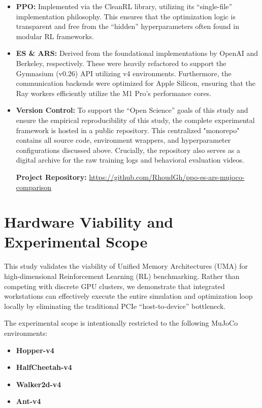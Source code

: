 \begin{itemize}
    \item \textbf{PPO:} Implemented via the CleanRL library, utilizing its ``single-file'' implementation philosophy. This ensures that the optimization logic is transparent and free from the ``hidden'' hyperparameters often found in modular RL frameworks.
    
    \item \textbf{ES \& ARS:} Derived from the foundational implementations by OpenAI and Berkeley, respectively. These were heavily refactored to support the Gymnasium (v0.26) API utilizing v4 environments. Furthermore, the communication backends were optimized for Apple Silicon, ensuring that the Ray workers efficiently utilize the M1 Pro's performance cores.
    
    \item \textbf{Version Control:} To support the ``Open Science'' goals of this study  and ensure the empirical reproducibility of this study, the complete experimental framework is hosted in a public repository. This centralized "monorepo" contains all source code, environment wrappers, and hyperparameter configurations discussed above. Crucially, the repository also serves as a digital archive for the raw training logs and behavioral evaluation videos.
    
 \noindent\textbf{Project Repository:} 
\href{https://github.com/RhoudGh/ppo-es-ars-mujoco-comparison}{https://github.com/RhoudGh/ppo-es-ars-mujoco-comparison}

\end{itemize}

\section{Hardware Viability and Experimental Scope}

This study validates the viability of Unified Memory Architectures (UMA) for high-dimensional Reinforcement Learning (RL) benchmarking. Rather than competing with discrete GPU clusters, we demonstrate that integrated workstations can effectively execute the entire simulation and optimization loop locally by eliminating the traditional PCIe ``host-to-device'' bottleneck.

The experimental scope is intentionally restricted to the following MuJoCo environments:
\begin{itemize}
    \item \textbf{Hopper-v4}
    \item \textbf{HalfCheetah-v4}
    \item \textbf{Walker2d-v4}
    \item \textbf{Ant-v4}
\end{itemize}

